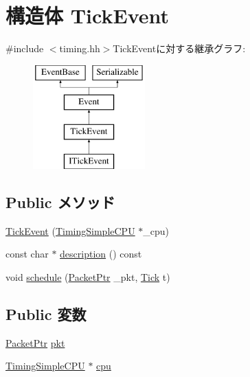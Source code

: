 \hypertarget{structTimingSimpleCPU_1_1TimingCPUPort_1_1TickEvent}{
\section{構造体 TickEvent}
\label{structTimingSimpleCPU_1_1TimingCPUPort_1_1TickEvent}
}


{\ttfamily \#include $<$timing.hh$>$}TickEventに対する継承グラフ:\begin{figure}[H]
\begin{center}
\leavevmode
\includegraphics[height=4cm]{structTimingSimpleCPU_1_1TimingCPUPort_1_1TickEvent}
\end{center}
\end{figure}
\subsection*{Public メソッド}
\begin{DoxyCompactItemize}
\item 
\hyperlink{structTimingSimpleCPU_1_1TimingCPUPort_1_1TickEvent_a494c07ddc76dc362344524431bc0edb0}{TickEvent} (\hyperlink{classTimingSimpleCPU_1_1TimingSimpleCPU}{TimingSimpleCPU} $\ast$\_\-cpu)
\item 
const char $\ast$ \hyperlink{structTimingSimpleCPU_1_1TimingCPUPort_1_1TickEvent_a2bd90422eece9190794479e08092a252}{description} () const 
\item 
void \hyperlink{structTimingSimpleCPU_1_1TimingCPUPort_1_1TickEvent_abe6619704168cff2b6e6c1c4d91de7bd}{schedule} (\hyperlink{classPacket}{PacketPtr} \_\-pkt, \hyperlink{base_2types_8hh_a5c8ed81b7d238c9083e1037ba6d61643}{Tick} t)
\end{DoxyCompactItemize}
\subsection*{Public 変数}
\begin{DoxyCompactItemize}
\item 
\hyperlink{classPacket}{PacketPtr} \hyperlink{structTimingSimpleCPU_1_1TimingCPUPort_1_1TickEvent_a3a891bc2a0fcbe6be5297077d94e2df7}{pkt}
\item 
\hyperlink{classTimingSimpleCPU_1_1TimingSimpleCPU}{TimingSimpleCPU} $\ast$ \hyperlink{structTimingSimpleCPU_1_1TimingCPUPort_1_1TickEvent_ace3e131319475077fac2fa861708b0c9}{cpu}
\end{DoxyCompactItemize}


